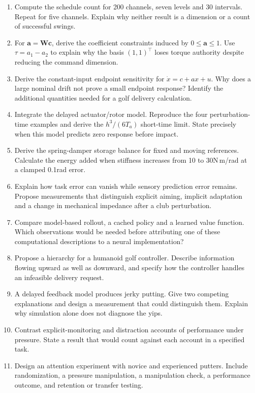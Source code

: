 \begin{enumerate}[leftmargin=*,itemsep=8pt]
\item Compute the schedule count for 200 channels, seven levels and 30 intervals. Repeat for five channels. Explain why neither result is a dimension or a count of successful swings.
\item For $\bm a=\bm W\bm c$, derive the coefficient constraints induced by $0\leq\bm a\leq1$. Use $\tau=a_1-a_2$ to explain why the basis $(1,1)^\top$ loses torque authority despite reducing the command dimension.
\item Derive the constant-input endpoint sensitivity for $\dot x=c+ax+u$. Why does a large nominal drift not prove a small endpoint response? Identify the additional quantities needed for a golf delivery calculation.
\item Integrate the delayed actuator/rotor model. Reproduce the four perturbation-time examples and derive the $h^3/(6T_a)$ short-time limit. State precisely when this model predicts zero response before impact.
\item Derive the spring-damper storage balance for fixed and moving references. Calculate the energy added when stiffness increases from 10 to 30N\,m/rad at a clamped 0.1rad error.
\item Explain how task error can vanish while sensory prediction error remains. Propose measurements that distinguish explicit aiming, implicit adaptation and a change in mechanical impedance after a club perturbation.
\item Compare model-based rollout, a cached policy and a learned value function. Which observations would be needed before attributing one of these computational descriptions to a neural implementation?
\item Propose a hierarchy for a humanoid golf controller. Describe information flowing upward as well as downward, and specify how the controller handles an infeasible delivery request.
\item A delayed feedback model produces jerky putting. Give two competing explanations and design a measurement that could distinguish them. Explain why simulation alone does not diagnose the yips.
\item Contrast explicit-monitoring and distraction accounts of performance under pressure. State a result that would count against each account in a specified task.
\item Design an attention experiment with novice and experienced putters. Include randomization, a pressure manipulation, a manipulation check, a performance outcome, and retention or transfer testing.

\end{enumerate}
